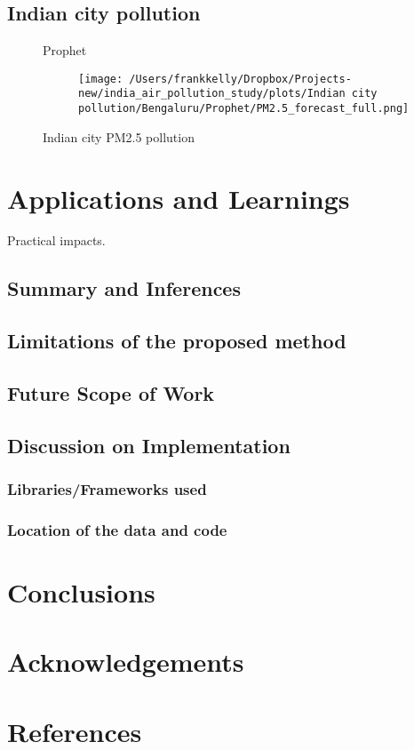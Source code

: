 \documentclass[manuscript,screen,nonacm]{acmart}
\numberwithin{equation}{section}
\begin{document}
\subsection{Indian city pollution}
\label{sec:indiancitypollution}
\begin{figure}[H]
	\centering
	\begin{description}
		\item[Prophet] \texttt{[image: /Users/frankkelly/Dropbox/Projects-new/india\_air\_pollution\_study/plots/Indian city pollution/Bengaluru/Prophet/PM2.5\_forecast\_full.png]}
	\end{description}
	\caption{Indian city PM2.5 pollution}	
	\label{fig:indiancitypollution}
\end{figure}



\section{Applications and Learnings}
\label{sec:appln}
Practical impacts.
\subsection{Summary and Inferences}
\subsection{Limitations of the proposed method}
\subsection{Future Scope of Work}
\subsection{Discussion on Implementation}
\subsubsection{Libraries/Frameworks used}
\subsubsection{Location of the data and code} 

\section{Conclusions}
\label{sec:concl}

\section*{Acknowledgements}

\section*{References}
\begin{thebibliography}{10}
\end{thebibliography}
\end{document}
